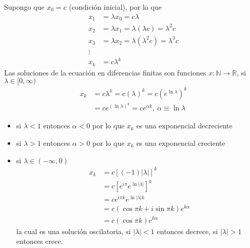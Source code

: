 	 Supongo que $x_{0}=c$ (condición inicial), por lo que
	 \begin{equation*}
		 \begin{split}
			 x_1&=\lambda x_0 = c\lambda \\
			x_2 &= \lambda x_1  = \lambda(\lambda c) = \lambda^2 c\\
			x_3 &= \lambda x_2 = \lambda(\lambda^2 c) = \lambda^3c \\
			\vdots& \\                            
				x_k	&= c\lambda^{k}
		 \end{split}
	 \end{equation*}
	 Las soluciones de la ecuación en diferencias finitas son funciones $x: \mathbb{N} \to \mathbb{R}$, si $\lambda \in [0,\infty)$
	 \begin{align*}
	   x_k &= c\lambda^{k} = c(\lambda)^{k} = c \left( e^{\ln\lambda} \right)^{k} \\
				 &= c e^{\left( \ln\lambda \right)^{k} } = c e^{\alpha k},\ \alpha \equiv \ln\lambda
	 \end{align*}
	 \begin{itemize}
	 	\item si $\lambda<1$ entonces $\alpha<0$ por lo que $x_k$ es una exponencial decreciente
		\item 	 si $\lambda>1$ entonces $\alpha>0$ por lo que $x_k$ es una exponencial creciente
		\item si $\lambda \in (-\infty,0)$
	 \begin{equation*}
		 \begin{split}
			 x_k &= c \left[ (-1) |\lambda| \right]^{k}   \\  
					 &= c \left[ e^{i\pi}e^{\ln |\lambda|} \right]^{k}  \\
					 &= c e^{i \pi k} e^{\ln |\lambda|k}\\
					 &= c(\cos\pi k + i \sin \pi k) e^{k \alpha} \\
					 &= c(\cos \pi k) e^{k \alpha}
		 \end{split}
	 \end{equation*}
	 la cual es una solución oscilatoria, si $|\lambda|<1$ entonces decrece, si $|\lambda|>1$ entonces crece.
	 \end{itemize}




